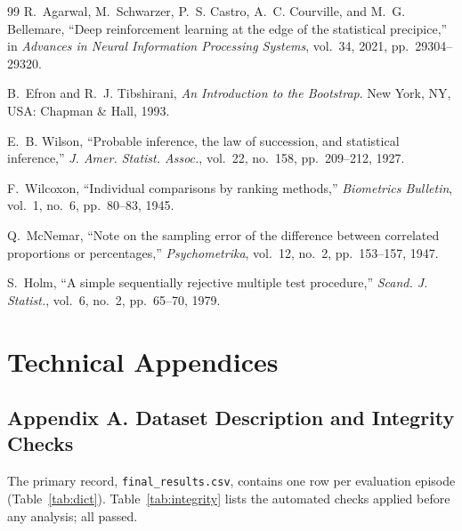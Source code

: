 \documentclass[11pt,a4paper]{article}
\begin{document}
\begin{thebibliography}{99}
 R.~Agarwal, M.~Schwarzer, P.~S. Castro, A.~C. Courville, and M.~G. Bellemare, ``Deep reinforcement learning at the edge of the statistical precipice,'' in \emph{Advances in Neural Information Processing Systems}, vol.~34, 2021, pp.~29304--29320.

 B.~Efron and R.~J. Tibshirani, \emph{An Introduction to the Bootstrap}. New York, NY, USA: Chapman \& Hall, 1993.

 E.~B. Wilson, ``Probable inference, the law of succession, and statistical inference,'' \emph{J. Amer. Statist. Assoc.}, vol.~22, no.~158, pp.~209--212, 1927.

 F.~Wilcoxon, ``Individual comparisons by ranking methods,'' \emph{Biometrics Bulletin}, vol.~1, no.~6, pp.~80--83, 1945.

 Q.~McNemar, ``Note on the sampling error of the difference between correlated proportions or percentages,'' \emph{Psychometrika}, vol.~12, no.~2, pp.~153--157, 1947.

 S.~Holm, ``A simple sequentially rejective multiple test procedure,'' \emph{Scand. J. Statist.}, vol.~6, no.~2, pp.~65--70, 1979.

\end{thebibliography}
\endgroup

\clearpage
\section*{Technical Appendices}

\subsection*{Appendix A. Dataset Description and Integrity Checks}

The primary record, \texttt{final\_results.csv}, contains one row per evaluation episode (Table~\ref{tab:dict}). Table~\ref{tab:integrity} lists the automated checks applied before any analysis; all passed.
\end{document}
